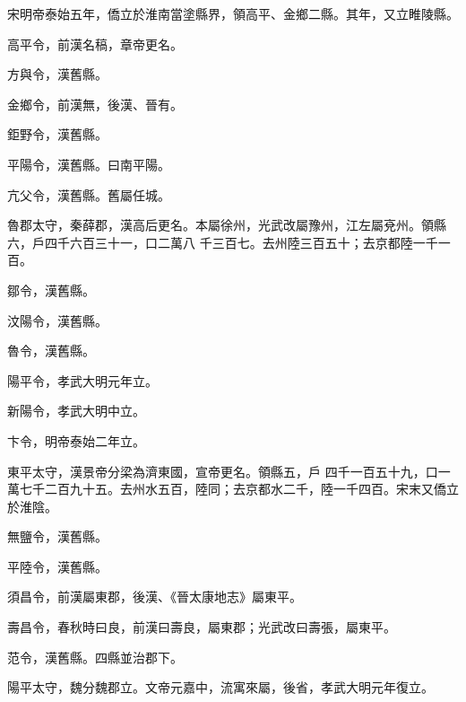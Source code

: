\begin{pinyinscope}
 宋明帝泰始五年，僑立於淮南當塗縣界，領高平、金鄉二縣。其年，又立睢陵縣。



 高平令，前漢名稿，章帝更名。



 方與令，漢舊縣。



 金鄉令，前漢無，後漢、晉有。



 鉅野令，漢舊縣。



 平陽令，漢舊縣。曰南平陽。



 亢父令，漢舊縣。舊屬任城。



 魯郡太守，秦薛郡，漢高后更名。本屬徐州，光武改屬豫州，江左屬兗州。領縣六，戶四千六百三十一，口二萬八
 千三百七。去州陸三百五十；去京都陸一千一百。



 鄒令，漢舊縣。



 汶陽令，漢舊縣。



 魯令，漢舊縣。



 陽平令，孝武大明元年立。



 新陽令，孝武大明中立。



 卞令，明帝泰始二年立。



 東平太守，漢景帝分梁為濟東國，宣帝更名。領縣五，戶
 四千一百五十九，口一萬七千二百九十五。去州水五百，陸同；去京都水二千，陸一千四百。宋末又僑立於淮陰。



 無鹽令，漢舊縣。



 平陸令，漢舊縣。



 須昌令，前漢屬東郡，後漢、《晉太康地志》屬東平。



 壽昌令，春秋時曰良，前漢曰壽良，屬東郡；光武改曰壽張，屬東平。



 范令，漢舊縣。四縣並治郡下。



 陽平太守，魏分魏郡立。文帝元嘉中，流寓來屬，後省，孝武大明元年復立。




\end{pinyinscope}
